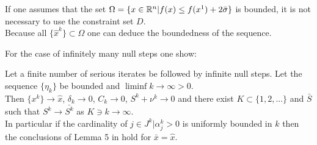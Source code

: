 \begin{remark}
If one assumes that the set \(\Omega = \{x \in \mathbb{R}^n |f(x) \leq f(x^1) +2\bar{\sigma}\}\) is bounded, it is not necessary to use the constraint set \(D\). \\
Because all \(\{\hat{x}^k\} \subset \Omega\) one can deduce the boundedness of the sequence.
\end{remark}

For the case of infinitely many null steps one show:

\begin{theorem} \cite{Hare2016}
	Let a finite number of serious iterates be followed by infinite null steps. Let the sequence \(\{\eta_k\}\) be bounded and \(\liminf k \to \infty > 0\). \\
	Then \(\{x^k\} \to \hat{x}\), \(\delta_k \to 0\), \(C_k \to 0\), \(S^k + \nu^k \to 0\) and there exist \(K\subset \{1,2,...\}\) and \(\bar{S}\) such that \(S^k \to \bar{S^k}\) as \(K \ni k \to \infty\). \\
	In particular if the cardinality of \({j \in J^k|\alpha_j^k > 0}\) is uniformly bounded in \(k\) then the conclusions of Lemma 5 in \cite{Hare2016} hold for \(\bar{x} = \hat{x}\). 
\end{theorem}


